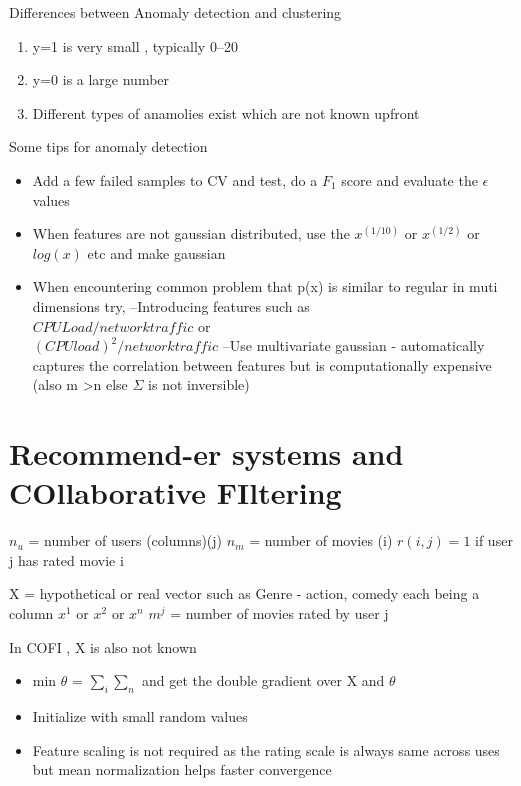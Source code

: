 \documentclass[12pt,a4paper]{article}
\begin{document}
Differences between Anomaly detection and clustering
\begin{enumerate}
\item y=1 is very small , typically 0--20
\item y=0 is a large number
\item Different types of anamolies exist which are not known upfront
\end{enumerate}

Some tips for anomaly detection
\begin{itemize}
\item Add a few failed samples to CV and test, do a $F_1$ score and evaluate the $\epsilon$ values
\item When features are not gaussian distributed, use the $x^{(1/10)}$ or $x^{(1/2)}$  or $log(x)$ etc and make gaussian
\item When encountering common problem that p(x) is similar to regular in muti dimensions try,
\subitem --Introducing features such as \\$CPU Load/network traffic$ or \\$(CPU load)^2/network traffic$
\subitem --Use multivariate gaussian - automatically captures the correlation between features but is computationally expensive (also m \textgreater n else $\Sigma$ is not inversible)
\end{itemize}

\section{Recommend-er systems and COllaborative FIltering}

$n_u$ = number of users (columns)(j)
$n_m$ = number of movies (i)
$r(i,j) = 1$ if user j has rated movie i

X = hypothetical or real vector such as Genre - action, comedy each being a column $x^1$ or $x^2$ or $x^n$
$m^j$ = number of movies rated by user j

In COFI , X is also not known
\begin{itemize}
\item min $\theta$  = $\sum_i \sum _n$  and get the double gradient over X and $\theta$
\item Initialize with small random values
\item Feature scaling is not required as the rating scale is always same across uses but mean normalization helps faster convergence

\end{itemize}
\end{document}
